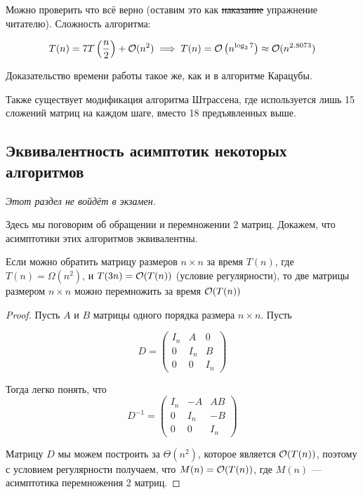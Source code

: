 \documentclass[a4paper, 12pt]{article}
\begin{document}
Можно проверить что всё верно (оставим это как \sout{наказание} упражнение читателю). Сложность алгоритма:

\[T(n) = 7T\left( \frac{n}{2} \right) + \mathcal{O}(n^2) \implies T(n) = \mathcal{O}\left(n^{\log_{2} 7} \right) \approx \mathcal{O}(n^{2.8073})\]

Доказательство времени работы такое же, как и в алгоритме Карацубы.

Также существует модификация алгоритма Штрассена, где используется лишь 15
сложений матриц на каждом шаге, вместо 18 предъявленных выше.

\subsection{Эквивалентность асимптотик некоторых алгоритмов}

\emph{Этот раздел не войдёт в экзамен.}

Здесь мы поговорим об обращении и перемножении 2 матриц. Докажем, что асимптотики
этих алгоритмов эквивалентны.

\begin{Theorem}
  Если можно обратить матрицу размеров $n \times n$ за время $T(n)$,
  где $T(n) = \Omega(n^2)$, и $T(3n) = \mathcal{O}(T(n))$ (условие регулярности), то две
  матрицы размером $n \times n$ можно перемножить за время $\mathcal{O}(T(n))$
\end{Theorem}

\begin{proof}
  Пусть $A$ и $B$ матрицы одного порядка размера $n \times n$. Пусть

  \[D = 
  \begin{pmatrix}
      I_n & A & 0\\
      0 & I_n & B\\
      0 & 0 & I_n
  \end{pmatrix}\]

  Тогда легко понять, что
  \[
    D^{-1} =
    \begin{pmatrix}
      I_n & -A & AB\\
      0 & I_n & -B \\
      0 & 0 & I_n
    \end{pmatrix}
  \]

  Матрицу $D$ мы можем построить за $\Theta(n^2)$, которое является $\mathcal{O}(T(n))$,
  поэтому с условием регулярности получаем, что $M(n) = \mathcal{O}(T(n))$, где $M(n)$ ---
  асимптотика перемножения 2 матриц.
\end{proof}
\end{document}
